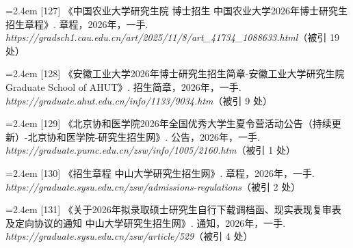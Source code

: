 {\vspace{0.6pt}
\vspace{3.5pt}\par
\nopagebreak\vspace{1pt}
\noindent\hangindent=2.4em \label{src:S0160}{\color{cAccent}[127]} 《中国农业大学研究生院 博士招生 中国农业大学2026年博士研究生招生章程》. 章程，2026年，一手. \textit{https://gradsch1.cau.edu.cn/art/2025/11/8/art\_41734\_1088633.html}（被引 19 处）\par
\vspace{0.6pt}
\vspace{3.5pt}\par
\nopagebreak\vspace{1pt}
\noindent\hangindent=2.4em \label{src:S0161}{\color{cAccent}[128]} 《安徽工业大学2026年博士研究生招生简章-安徽工业大学研究生院 Graduate School of AHUT》. 招生简章，2026年，一手. \textit{https://graduate.ahut.edu.cn/info/1133/9034.htm}（被引 9 处）\par
\vspace{0.6pt}
\vspace{3.5pt}\par
\nopagebreak\vspace{1pt}
\noindent\hangindent=2.4em \label{src:S0162}{\color{cAccent}[129]} 《北京协和医学院2026年全国优秀大学生夏令营活动公告（持续更新）-北京协和医学院-研究生招生网》. 公告，2026年，一手. \textit{https://graduate.pumc.edu.cn/zsw/info/1005/2160.htm}（被引 1 处）\par
\vspace{0.6pt}
\vspace{3.5pt}\par
\nopagebreak\vspace{1pt}
\noindent\hangindent=2.4em \label{src:S0163}{\color{cAccent}[130]} 《招生章程 \textbar{} 中山大学研究生招生网》. 章程，2026年，一手. \textit{https://graduate.sysu.edu.cn/zsw/admissions-regulations}（被引 2 处）\par
\vspace{0.6pt}
\noindent\hangindent=2.4em \label{src:S0164}{\color{cAccent}[131]} 《关于2026年拟录取硕士研究生自行下载调档函、现实表现复审表及定向协议的通知 \textbar{} 中山大学研究生招生网》. 通知，2026年，一手. \textit{https://graduate.sysu.edu.cn/zsw/article/529}（被引 4 处）\par
}
